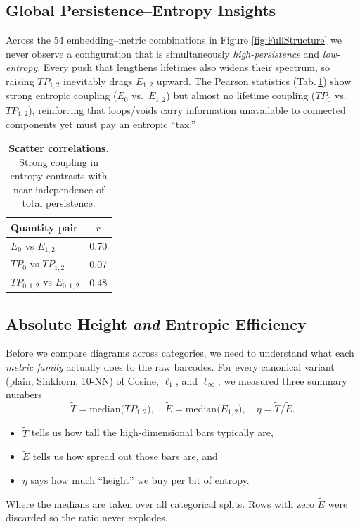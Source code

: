 \documentclass[fleqn,10pt]{SelfArx}
\begin{document}
\subsection{Global Persistence–Entropy Insights}\label{sec:global-landscape}
Across the 54 embedding–metric combinations in Figure \ref{fig:FullStructure} we never observe a configuration that is simultaneously \emph{high-persistence} and \emph{low-entropy}.
Every push that lengthens lifetimes also widens their spectrum, so raising $TP_{1,2}$ inevitably drags $E_{1,2}$ upward.  
The Pearson statistics (Tab.\,\ref{tab:corr}) show strong entropic coupling ($E_0$ vs.\ $E_{1,2}$) but almost no lifetime coupling ($TP_0$ vs.\ $TP_{1,2}$), reinforcing that loops/voids carry information unavailable to connected components yet must pay an entropic “tax.”

\begin{table}[h]
  \centering
  \label{tab:corr}
  \begin{tabular}{lc}
  \toprule
  Quantity pair & $r$\\
  \midrule
  $E_0$ vs $E_{1,2}$ & 0.70\\
  $TP_0$ vs $TP_{1,2}$ & 0.07\\
  $TP_{0,1,2}$ vs $E_{0,1,2}$ & 0.48\\
  \bottomrule
  \end{tabular}
  \caption{\textbf{Scatter correlations.} Strong coupling in entropy contrasts with near-independence of total persistence.}
\end{table}
\subsection{Absolute Height \emph{and} Entropic Efficiency}\label{sec:metric-families}

Before we compare diagrams across categories, we need to understand what each \emph{metric family} actually does to the raw barcodes.  For every canonical variant (plain, Sinkhorn, 10-NN) of Cosine, $\ell_1$, and $\ell_\infty$, we measured three summary numbers
\[
\tilde T=\text{median}\bigl(TP_{1,2}\bigr),\quad
\tilde E=\text{median}\bigl(E_{1,2}\bigr),\quad
\eta=\tilde T/\tilde E.
\]  
\begin{itemize}[leftmargin=*]
	\item $\tilde T$ tells us how tall the high-dimensional bars typically are,
	\item $\tilde E$ tells us how spread out those bars are, and
	\item $\eta$ says how much “height” we buy per bit of entropy.
\end{itemize}
Where the medians are taken over all categorical splits. Rows with zero $\tilde E$ were discarded so the ratio never explodes.\\
\end{document}

